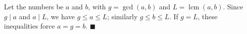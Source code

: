 Let the numbers be $a$ and $b$, with $g=\gcd(a,b)$ and $L=\operatorname{lcm}(a,b)$. Since $g\mid a$ and $a\mid L$, we have $g\le a\le L$; similarly $g\le b\le L$. If $g=L$, these inequalities force $a=g=b$. $\blacksquare$

